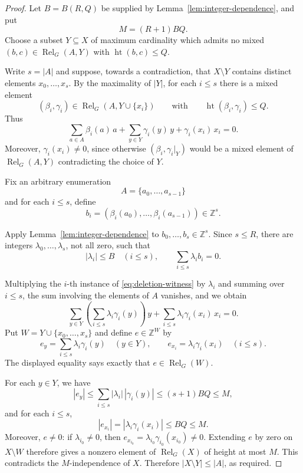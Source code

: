 \documentclass[11pt]{amsart}
\theoremstyle{definition}
\newcommand{\Z}{\mathbb Z}
\newcommand{\Rel}{\operatorname{Rel}}
\newcommand{\htop}{\operatorname{ht}}
\begin{document}
\begin{proof}
Let $B=B(R,Q)$ be supplied by
Lemma~\ref{lem:integer-dependence}, and put
\[
M=(R+1)BQ.
\]
Choose a subset $Y\subseteq X$ of maximum cardinality which admits no
mixed $(b,c)\in\Rel_G(A,Y)$ with $\htop(b,c)\le Q$.

Write $s=|A|$ and suppose, towards a contradiction, that
$X\setminus Y$ contains distinct elements $x_0,\ldots,x_s$. By the
maximality of
$|Y|$, for each $i\leq s$ there is a mixed element
\[
 (\beta_i,\gamma_i)\in\Rel_G(A,Y\cup\{x_i\})
 \qquad\text{with}\qquad
 \htop(\beta_i,\gamma_i)\leq Q.
\]
Thus
\begin{equation}\label{eq:deletion-witness}
 \sum_{a\in A}\beta_i(a)\,a
 +
 \sum_{y\in Y}\gamma_i(y)\,y
 +
 \gamma_i(x_i)\,x_i
 =0.
\end{equation}
Moreover, $\gamma_i(x_i)\ne0$, since otherwise
$(\beta_i,\gamma_i|_Y)$ would be a mixed element of $\Rel_G(A,Y)$
contradicting the choice of $Y$.

Fix an arbitrary enumeration
\[
A=\{a_0,\ldots,a_{s-1}\}
\]
and for each $i\le s$, define
\[
b_i=(\beta_i(a_0),\ldots,\beta_i(a_{s-1}))\in\Z^s.
\] 

Apply Lemma~\ref{lem:integer-dependence} to
$b_0,\ldots,b_s\in\Z^s$.  Since $s\le R$, there are integers
$\lambda_0,\ldots,\lambda_s$, not all zero, such that
\[
|\lambda_i|\le B\quad(i\le s),
\qquad
\sum_{i\le s}\lambda_i b_i=0.
\]

Multiplying the $i$-th instance of \eqref{eq:deletion-witness} by $\lambda_i$
and summing over $i\leq s$, the sum involving the elements of $A$ vanishes,
and we obtain
\[
\sum_{y\in Y}
 \left(\sum_{i\le s}\lambda_i\gamma_i(y)\right)\,y
+
\sum_{i\le s}\lambda_i\gamma_i(x_i)\,x_i
=0.
\]
Put $W=Y\cup\{x_0,\ldots,x_s\}$ and define $e\in\Z^W$ by
\[
 e_y=\sum_{i\leq s}\lambda_i\gamma_i(y)\quad(y\in Y),
 \qquad
 e_{x_i}=\lambda_i\gamma_i(x_i)\quad(i\leq s).
\]
The displayed equality says exactly that $e\in\Rel_G(W)$.

For each $y\in Y$, we have
\[
|e_y|\leq\sum_{i\le s}|\lambda_i|\,|\gamma_i(y)|
\le(s+1)BQ\le M,
\]
and for each $i\leq s$,
\[
|e_{x_i}|=|\lambda_i\gamma_i(x_i)|\le BQ\le M.
\]
Moreover, $e\neq0$: if $\lambda_{i_0}\ne0$, then
$e_{x_{i_0}}=\lambda_{i_0}\gamma_{i_0}(x_{i_0})\ne0$.
Extending $e$ by zero on $X\setminus W$ therefore gives a nonzero element
of $\Rel_G(X)$ of height at most $M$.
This contradicts the $M$-independence of $X$.
Therefore
$|X\setminus Y|\le|A|$, as required.
\end{proof}
\end{document}
